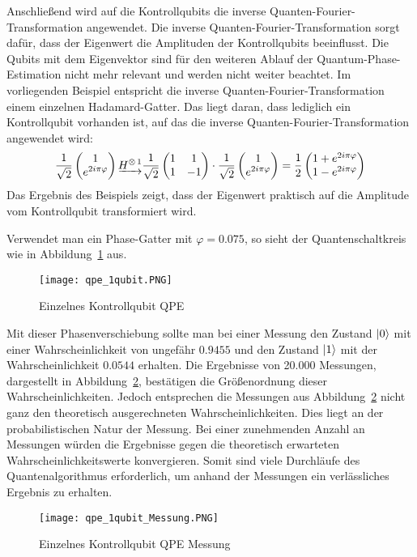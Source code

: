 Anschließend wird auf die Kontrollqubits die inverse Quanten-Fourier-Transformation angewendet.
Die inverse Quanten-Fourier-Transformation sorgt dafür, 
dass der Eigenwert die Amplituden der Kontrollqubits beeinflusst.
Die Qubits mit dem Eigenvektor sind für den weiteren Ablauf der Quantum-Phase-Estimation nicht mehr relevant 
und werden nicht weiter beachtet.
Im vorliegenden Beispiel entspricht die inverse Quanten-Fourier-Transformation einem einzelnen Hadamard-Gatter. 
Das liegt daran, dass lediglich ein Kontrollqubit vorhanden ist, 
auf das die inverse Quanten-Fourier-Transformation angewendet wird:
\[
\frac{1}{\sqrt{2}}
\begin{pmatrix}
  1 \\
  e^{2 i \pi \varphi}
 \end{pmatrix}
 \underrightarrow{H^{\operatorname{\otimes}1}}
 \frac{1}{\sqrt{2}}
 \begin{pmatrix}
  1 & 1\\
  1 & -1
 \end{pmatrix}
 \cdot
 \frac{1}{\sqrt{2}}
\begin{pmatrix}
  1 \\
  e^{2 i \pi \varphi}
 \end{pmatrix}
 =
 \frac{1}{2}
 \begin{pmatrix}
  1 + e^{2 i \pi \varphi}\\
  1 - e^{2 i \pi \varphi}
 \end{pmatrix}
\]
Das Ergebnis des Beispiels zeigt, dass der Eigenwert praktisch auf die Amplitude vom Kontrollqubit transformiert wird.

Verwendet man ein Phase-Gatter mit \(\varphi  = 0.075\), 
so sieht der Quantenschaltkreis wie in Abbildung~\ref{fig:qpe_1qubit} aus.
\begin{figure}[H]
  \centering
  \texttt{[image: qpe\_1qubit.PNG]}
  \caption{Einzelnes Kontrollqubit QPE}
  \label{fig:qpe_1qubit}
\end{figure}
Mit dieser Phasenverschiebung sollte man bei einer Messung den Zustand \(\ket{0}\)
mit einer Wahrscheinlichkeit von ungefähr \(0.9455\) 
und den Zustand \(\ket{1}\) mit der Wahrscheinlichkeit \(0.0544\) erhalten.
Die Ergebnisse von 20.000 Messungen, dargestellt in Abbildung~\ref{fig:qpe_1qubit_Messung}, 
bestätigen die Größenordnung dieser Wahrscheinlichkeiten.
Jedoch entsprechen die Messungen aus Abbildung~\ref{fig:qpe_1qubit_Messung} nicht ganz den theoretisch ausgerechneten Wahrscheinlichkeiten.
Dies liegt an der probabilistischen Natur der Messung.
Bei einer zunehmenden Anzahl an Messungen würden die Ergebnisse gegen die theoretisch erwarteten Wahrscheinlichkeitswerte konvergieren.
Somit sind viele Durchläufe des Quantenalgorithmus erforderlich, 
um anhand der Messungen ein verlässliches Ergebnis zu erhalten.
\begin{figure}[H]
  \caption{Einzelnes Kontrollqubit QPE Messung}
  \label{fig:qpe_1qubit_Messung}
  \texttt{[image: qpe\_1qubit\_Messung.PNG]}
  \centering
  \end{figure}
  

